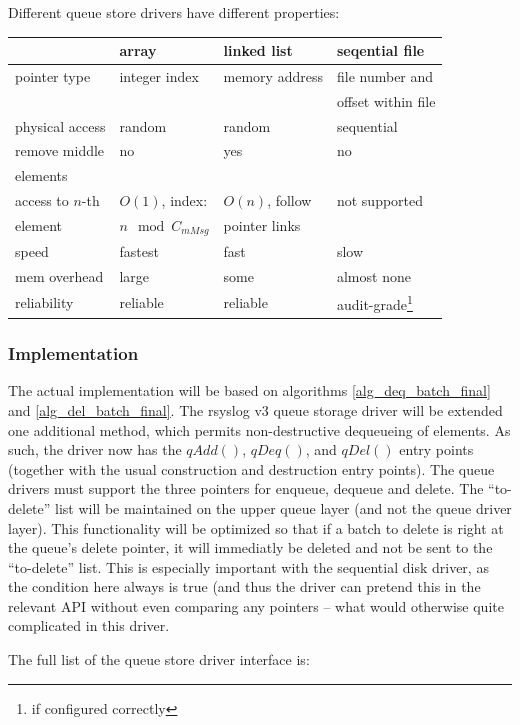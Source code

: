 \documentclass[a4paper,10pt]{article}
\begin{document}
Different queue store drivers have different properties:

\begin{tabular}{|l||l|l|l|}\hline
		&	array 	& linked list		& seqential file \\ \hline
pointer type	& integer index	& memory address	& file number and \\
		&		&			& offset within file \\ \hline
physical access	& random	& random		& sequential \\ \hline
remove middle	& no		& yes			& no \\
elements	&		&			& \\ \hline
access to $n$-th& $O(1)$, index:& $O(n)$, follow	& not supported \\
element		& $n \mod C_{mMsg}$	& pointer links	& \\ \hline
speed		& fastest	& fast			& slow \\\hline
mem overhead	& large		& some			& almost none \\\hline
reliability	& reliable	& reliable		& audit-grade\footnote{if configured correctly}\\
\hline
\end{tabular}

\subsubsection{Implementation}
The actual implementation will be based on algorithms \ref{alg_deq_batch_final} and \ref{alg_del_batch_final}. The rsyslog v3 queue storage driver will be extended one additional method, which permits non-destructive dequeueing of elements. As such, the driver now has the $qAdd()$, $qDeq()$, and $qDel()$ entry points (together with the usual construction and destruction entry points). The queue drivers must support the three pointers for enqueue, dequeue and delete. The ``to-delete'' list will be maintained on the upper queue layer (and not the queue driver layer). This functionality will be optimized so that if a batch to delete is right at the queue's delete pointer, it will immediatly be deleted and not be sent to the ``to-delete'' list. This is especially important with the sequential disk driver, as the condition here always is true (and thus the driver can pretend this in the relevant API without even comparing any pointers -- what would otherwise quite complicated in this driver.

The full list of the queue store driver interface is:
\end{document}
